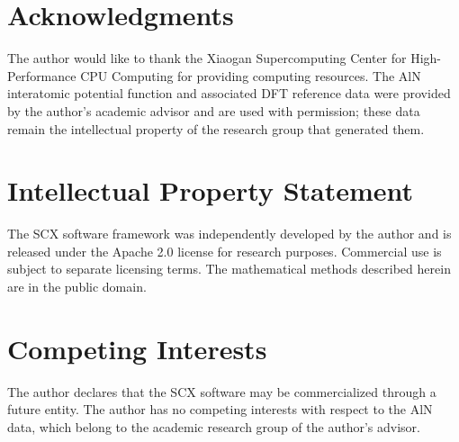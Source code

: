 \documentclass[twoside,prb,aps,floatfix,superscriptaddress,longbibliography]{revtex4-2}
\begin{document}
\section*{Acknowledgments}
The author would like to thank the Xiaogan Supercomputing Center for High-Performance CPU Computing for providing computing resources. The AlN interatomic potential function and associated DFT reference data were provided by the author's academic advisor and are used with permission; these data remain the intellectual property of the research group that generated them.

\section*{Intellectual Property Statement}
The SCX software framework was independently developed by the author and is released under the Apache 2.0 license for research purposes. Commercial use is subject to separate licensing terms. The mathematical methods described herein are in the public domain.

\section*{Competing Interests}
The author declares that the SCX software may be commercialized through a future entity. The author has no competing interests with respect to the AlN data, which belong to the academic research group of the author's advisor.
\end{document}
